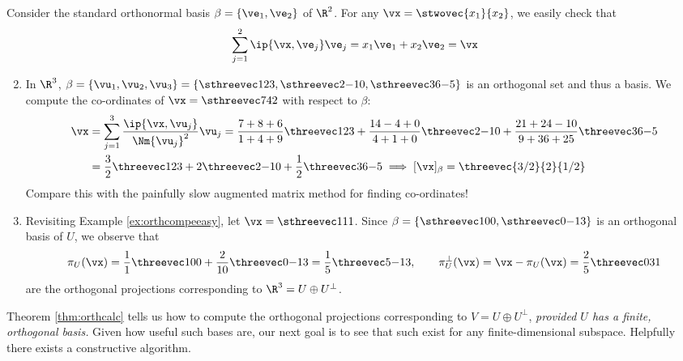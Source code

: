 \begin{examples}{}{}
\exstart Consider the standard orthonormal basis $\beta=\{\ve_1,\ve_2\}$ of $\R^2$. For any $\vx=\stwovec{x_1}{x_2}$, we easily check that
  \[\sum_{j=1}^2\ip{\vx,\ve_j}\ve_j=x_1\ve_1+x_2\ve_2=\vx\]
\begin{enumerate}\setcounter{enumi}{1}
  \item In $\R^3$, $\beta=\{\vu_1,\vu_2,\vu_3\}=\left\{\sthreevec 123,\sthreevec 2{-1}0,\sthreevec 36{-5}\right\}$ is an orthogonal set and thus a basis. We compute the co-ordinates of $\vx=\sthreevec 742$ with respect to $\beta$:\vspace{-3pt}
	\begin{align*}
	\vx&=\sum_{j=1}^3\frac{\ip{\vx,\vu_j}}{\Nm{\vu_j}^2}\vu_j = \frac{7+8+6}{1+4+9}\threevec 123 + \frac{14-4+0}{4+1+0}\threevec 2{-1}0 + \frac{21+24-10}{9+36+25}\threevec 36{-5}\\
	&= \frac 32\threevec 123 + 2\threevec 2{-1}0 + \frac 12\threevec 36{-5} \implies [\vx]_\beta=\threevec{3/2}{2}{1/2}
	\end{align*}
	Compare this with the painfully slow augmented matrix method for finding co-ordinates!
% 	

	\item Revisiting Example \ref{ex:orthcompeeasy}, let $\vx=\sthreevec 111$. Since $\beta=\left\{\sthreevec 100,\sthreevec 0{-1}3\right\}$ is an orthogonal basis of $U$, we observe that
	\[\pi_U(\vx)=\frac{1}{1}\threevec 100+\frac{2}{10}\threevec 0{-1}3=\frac 15\threevec 5{-1}3,\qquad \pi_U^\perp(\vx)=\vx-\pi_U(\vx)=\frac 25\threevec 031\]
	are the orthogonal projections corresponding to $\R^3=U\oplus U^\perp$.
\end{enumerate}
\end{examples}


Theorem \ref{thm:orthcalc} tells us how to compute the orthogonal projections corresponding to $V=U\oplus U^\perp$, \emph{provided $U$ has a finite, orthogonal basis.} Given how useful such bases are, our next goal is to see that such exist for any finite-dimensional subspace. Helpfully there exists a constructive algorithm.

